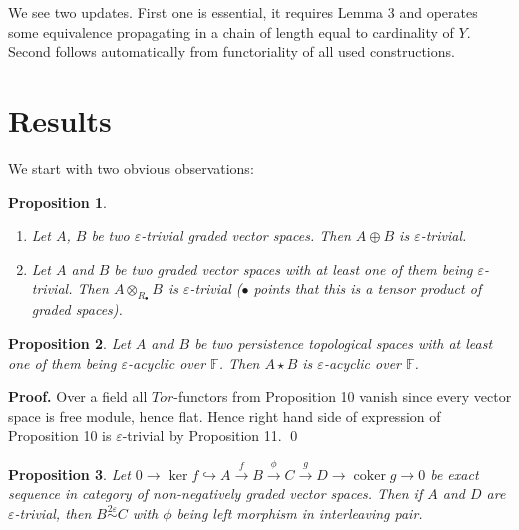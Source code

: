 \documentclass[a4paper, 12pt]{article}
\newtheorem{proposition}{Proposition}
\theoremstyle{definition}
\theoremstyle{remark}
\newenvironment{pf}{\noindent\textbf{Proof.}}{\qed}
\begin{document}
We see two updates. First one is essential, it requires Lemma 3 and operates some equivalence propagating in a chain of length equal to cardinality of $Y$. Second follows automatically from functoriality of all used constructions.

\section{Results}

We start with two obvious observations:

\begin{proposition} ~ \par
  \begin{enumerate}
    \item Let $A$, $B$ be two $\varepsilon$-trivial graded vector spaces. Then $A \oplus B$ is $\varepsilon$-trivial.
    \item Let $A$ and $B$ be two graded vector spaces with at least one of them being $\varepsilon$-trivial. Then $A \otimes_{R_{\bullet}} B$ is $\varepsilon$-trivial ($\bullet$ points that this is a tensor product of graded spaces).
  \end{enumerate}
\end{proposition}

\begin{proposition}
  Let $A$ and $B$ be two persistence topological spaces with at least one of them being $\varepsilon$-acyclic over $\mathbb{F}$. Then $A \star B$ is $\varepsilon$-acyclic over $\mathbb{F}$.
\end{proposition}

\begin{pf}
  Over a field all $Tor$-functors from Proposition 10 vanish since every vector space is free module, hence flat. Hence right hand side of expression of Proposition 10 is $\varepsilon$-trivial by Proposition 11.
\end{pf}

\begin{proposition}
  Let $0 \to \ker{f} \hookrightarrow A \xrightarrow{f} B \xrightarrow{\phi} C \xrightarrow{g} D \to \operatorname{coker}g \to 0$ be exact sequence in category of non-negatively graded vector spaces. Then if $A$ and $D$ are $\varepsilon$-trivial, then $B \stackrel{2\varepsilon}{\sim} C$ with $\phi$ being left morphism in interleaving pair.
\end{proposition}
\end{document}
